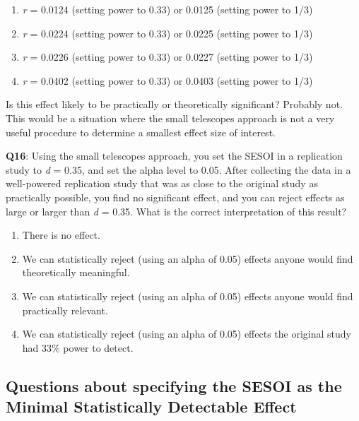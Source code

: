 \documentclass[
  oneside]{book}
\providecommand{\tightlist}{%
  \setlength{\itemsep}{0pt}\setlength{\parskip}{0pt}}
\begin{document}
\begin{enumerate}
\def\labelenumi{\Alph{enumi})}
\tightlist
\item
  \emph{r} = 0.0124 (setting power to 0.33) or 0.0125 (setting power to 1/3)
\item
  \emph{r} = 0.0224 (setting power to 0.33) or 0.0225 (setting power to 1/3)
\item
  \emph{r} = 0.0226 (setting power to 0.33) or 0.0227 (setting power to 1/3)
\item
  \emph{r} = 0.0402 (setting power to 0.33) or 0.0403 (setting power to 1/3)
\end{enumerate}

Is this effect likely to be practically or theoretically significant? Probably not. This would be a situation where the small telescopes approach is not a very useful procedure to determine a smallest effect size of interest.

\textbf{Q16}: Using the small telescopes approach, you set the SESOI in a replication study to \emph{d} = 0.35, and set the alpha level to 0.05. After collecting the data in a well-powered replication study that was as close to the original study as practically possible, you find no significant effect, and you can reject effects as large or larger than \emph{d} = 0.35. What is the correct interpretation of this result?

\begin{enumerate}
\def\labelenumi{\Alph{enumi})}
\tightlist
\item
  There is no effect.
\item
  We can statistically reject (using an alpha of 0.05) effects anyone would find theoretically meaningful.
\item
  We can statistically reject (using an alpha of 0.05) effects anyone would find practically relevant.
\item
  We can statistically reject (using an alpha of 0.05) effects the original study had 33\% power to detect.
\end{enumerate}

\hypertarget{questions-about-specifying-the-sesoi-as-the-minimal-statistically-detectable-effect}{%
\subsection{Questions about specifying the SESOI as the Minimal Statistically Detectable Effect}\label{questions-about-specifying-the-sesoi-as-the-minimal-statistically-detectable-effect}}
\end{document}

